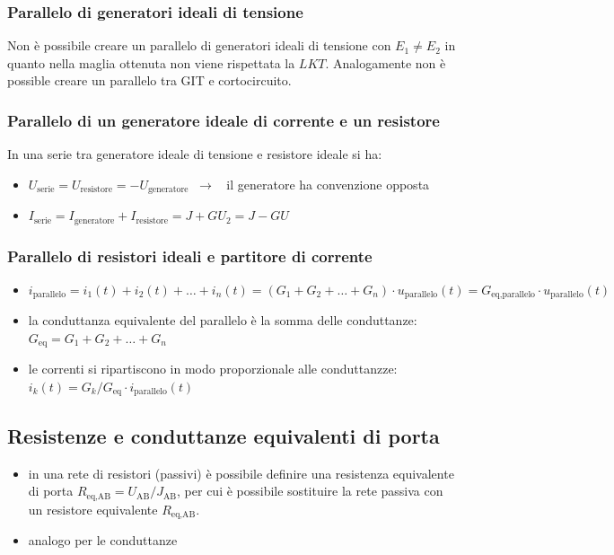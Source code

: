 \documentclass[a4paper]{article}
\begin{document}
\subsubsection*{Parallelo di generatori ideali di tensione}
Non è possibile creare un parallelo di generatori ideali di tensione con \(E_1 \neq E_2\) in quanto nella maglia ottenuta non
viene rispettata la \(LKT\). Analogamente non è possible creare un parallelo tra GIT e cortocircuito.

\subsubsection*{Parallelo di un generatore ideale di corrente e un resistore}
In una serie tra generatore ideale di tensione e resistore ideale si ha:
\begin{itemize}
	\item \(U_\text{serie} = U_\text{resistore} = -U_\text{generatore} \;\; \rightarrow \;\;\) il generatore ha convenzione opposta
	\item \(I_\text{serie} = I_\text{generatore} + I_\text{resistore} = J + G U_2 = J - GU\)
\end{itemize}

\subsubsection*{Parallelo di resistori ideali e partitore di corrente}
\begin{itemize}
	\item \(i_\text{parallelo} = i_1(t) + i_2(t) + \dots + i_n(t) = (G_1 + G_2 + \dots + G_n) \cdot u_\text{parallelo}(t) = G_\text{eq,parallelo} \cdot u_\text{parallelo}(t)\)
	\item la conduttanza equivalente del parallelo è la somma delle conduttanze: \(G_\text{eq} = G_1 + G_2 + \dots + G_n\) 
	\item le correnti si ripartiscono in modo proporzionale alle conduttanzze: \(i_k(t) = G_k / G_\text{eq} \cdot i_\text{parallelo}(t)\)
\end{itemize}

\subsection{Resistenze e conduttanze equivalenti di porta}
\begin{itemize}
	\item in una rete di resistori (passivi) è possibile definire una resistenza equivalente di porta \(R_\text{eq,AB} = U_\text{AB}/J_\text{AB}\),
	per cui è possibile sostituire la rete passiva con un resistore equivalente \(R_\text{eq,AB}\).
	\item analogo per le conduttanze
\end{itemize}
\end{document}
